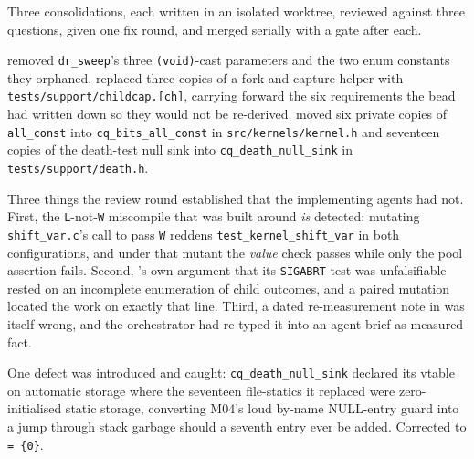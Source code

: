 Three consolidations, each written in an isolated worktree, reviewed
against three questions, given one fix round, and merged serially with a gate after each.

 removed \texttt{dr\_sweep}'s three \texttt{(void)}-cast parameters and the two enum
constants they orphaned.  replaced three copies of a fork-and-capture helper with
\texttt{tests/support/childcap.[ch]}, carrying forward the six requirements the bead had written
down so they would not be re-derived.  moved six private copies of \texttt{all\_const}
into \texttt{cq\_bits\_all\_const} in \texttt{src/kernels/kernel.h} and seventeen copies of the
death-test null sink into \texttt{cq\_death\_null\_sink} in \texttt{tests/support/death.h}.

Three things the review round established that the implementing agents had not. First, the
\texttt{L}-not-\texttt{W} miscompile that  was built around \emph{is} detected: mutating
\texttt{shift\_var.c}'s call to pass \texttt{W} reddens \texttt{test\_kernel\_shift\_var} in both
configurations, and under that mutant the \emph{value} check passes while only the pool assertion
fails. Second, 's own argument that its \texttt{SIGABRT} test was unfalsifiable rested on
an incomplete enumeration of child outcomes, and a paired mutation located the work on exactly that
line. Third, a dated re-measurement note in  was itself wrong, and the orchestrator had
re-typed it into an agent brief as measured fact.

One defect was introduced and caught: \texttt{cq\_death\_null\_sink} declared its vtable on
automatic storage where the seventeen file-statics it replaced were zero-initialised static storage,
converting M04's loud by-name NULL-entry guard into a jump through stack garbage should a seventh
entry ever be added. Corrected to \texttt{= \{0\}}.


